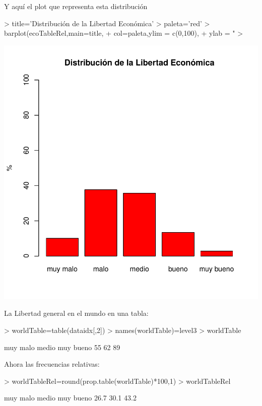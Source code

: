 \documentclass{article}
\begin{document}
Y aquí el plot que representa esta distribución
\begin{Schunk}
\begin{Sinput}
> title='Distribución de la Libertad Económica'
> paleta='red'
> barplot(ecoTableRel,main=title,
+         col=paleta,ylim = c(0,100),
+         ylab = "%
> 
\end{Sinput}
\end{Schunk}
\includegraphics{paperVersion_0-ecoTableRelPlot}


La Libertad general en el mundo en una tabla:
\begin{Schunk}
\begin{Sinput}
> worldTable=table(dataidx[,2])
> names(worldTable)=level3
> worldTable
\end{Sinput}
\begin{Soutput}
 muy malo     medio muy bueno 
       55        62        89 
\end{Soutput}
\end{Schunk}


Ahora las frecuencias relativas:
\begin{Schunk}
\begin{Sinput}
> worldTableRel=round(prop.table(worldTable)*100,1)
> worldTableRel
\end{Sinput}
\begin{Soutput}
 muy malo     medio muy bueno 
     26.7      30.1      43.2 
\end{Soutput}
\end{Schunk}
\end{document}
